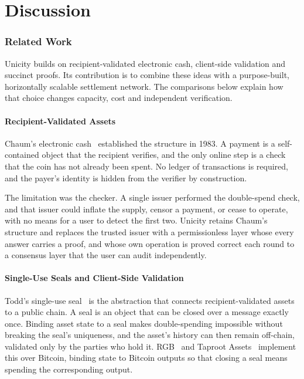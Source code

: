 \part{Discussion}\label{part:context}

\section{Related Work}\label{sec:sota}

Unicity builds on recipient-validated electronic cash, client-side validation and succinct proofs. Its contribution is to combine these ideas with a purpose-built, horizontally scalable settlement network. The comparisons below explain how that choice changes capacity, cost and independent verification.

\subsection{Recipient-Validated Assets}

Chaum's electronic cash~\cite{chaum1983} established the structure in 1983. A payment is a self-contained object that the recipient verifies, and the only online step is a check that the coin has not already been spent. No ledger of transactions is required, and the payer's identity is hidden from the verifier by construction.

The limitation was the checker. A single issuer performed the double-spend check, and that issuer could inflate the supply, censor a payment, or cease to operate, with no means for a user to detect the first two. Unicity retains Chaum's structure and replaces the trusted issuer with a permissionless layer whose every answer carries a proof, and whose own operation is proved correct each round to a consensus layer that the user can audit independently.

\subsection{Single-Use Seals and Client-Side Validation}

Todd's single-use seal~\cite{todd2016} is the abstraction that connects recipient-validated assets to a public chain. A seal is an object that can be closed over a message exactly once. Binding asset state to a seal makes double-spending impossible without breaking the seal's uniqueness, and the asset's history can then remain off-chain, validated only by the parties who hold it. RGB~\cite{rgb} and Taproot Assets~\cite{taprootassets} implement this over Bitcoin, binding state to Bitcoin outputs so that closing a seal means spending the corresponding output.


